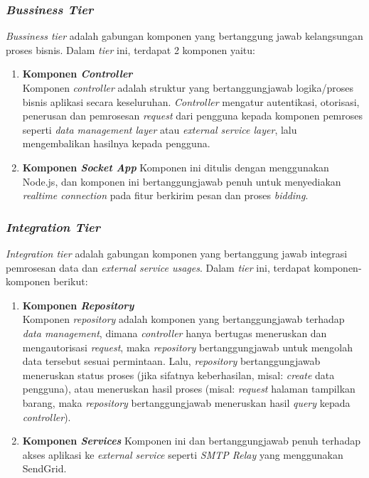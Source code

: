 	\subsubsection{\textit{Bussiness Tier}}
	\textit{Bussiness tier} adalah gabungan komponen yang bertanggung jawab kelangsungan proses bisnis. Dalam \textit{tier} ini, terdapat 2 komponen yaitu:
	\begin{enumerate}
		\item \textbf{Komponen \textit{Controller}} \\
		Komponen \textit{controller} adalah struktur yang bertanggungjawab logika/proses bisnis aplikasi secara keseluruhan. \textit{Controller} mengatur autentikasi, otorisasi, penerusan dan pemrosesan \textit{request} dari pengguna kepada komponen pemroses seperti \textit{data management layer} atau \textit{external service layer}, lalu mengembalikan hasilnya kepada pengguna.
		\item \textbf{Komponen \textit{Socket App}}
		Komponen ini ditulis dengan menggunakan Node.js, dan komponen ini bertanggungjawab penuh untuk menyediakan \textit{realtime connection} pada fitur berkirim pesan dan proses \textit{bidding}.
	\end{enumerate}
	
	\subsubsection{\textit{Integration Tier}}
	\textit{Integration tier} adalah gabungan komponen yang bertanggung jawab integrasi pemrosesan data dan \textit{external service usages}. Dalam \textit{tier} ini, terdapat komponen-komponen berikut:
	\begin{enumerate}
		\item \textbf{Komponen \textit{Repository}} \\
		Komponen \textit{repository} adalah komponen yang bertanggungjawab terhadap \textit{data management}, dimana \textit{controller} hanya bertugas meneruskan dan mengautorisasi \textit{request}, maka \textit{repository} bertanggungjawab untuk mengolah data tersebut sesuai permintaan. Lalu, \textit{repository} bertanggungjawab meneruskan status proses (jika sifatnya keberhasilan, misal: \textit{create} data pengguna), atau meneruskan hasil proses (misal: \textit{request} halaman tampilkan barang, maka \textit{repository} bertanggungjawab meneruskan hasil \textit{query} kepada \textit{controller}). \\
		\item \textbf{Komponen \textit{Services}}
		Komponen ini dan bertanggungjawab penuh terhadap akses aplikasi ke \textit{external service} seperti \textit{SMTP Relay} yang menggunakan SendGrid.
	\end{enumerate}
			
